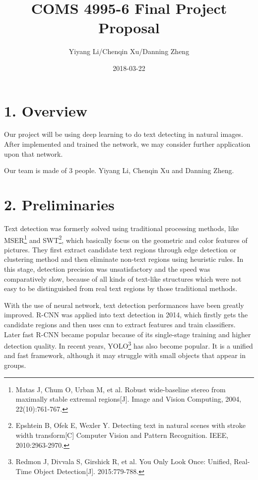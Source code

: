 \documentclass[]{article}
\title{COMS 4995-6 Final Project Proposal}
\author{Yiyang Li/Chenqin Xu/Danning Zheng}
\date{2018-03-22}
\begin{document}
\maketitle

\newcommand\E{\mathbb{E}}
\renewcommand\P{\mathbb{P}}
\newcommand\R{\mathbb{R}}
\newcommand\Var{\operatorname{Var}}

\section{1. Overview}

Our project will be using deep learning to do text detecting in natural images. After implemented and trained the network, we may consider further application upon that network.

Our team is made of 3 people. Yiyang Li, Chenqin Xu and Danning Zheng.

\section{2. Preliminaries}

Text detection was formerly solved using traditional processing methods, like MSER\footnote{Matas J, Chum O, Urban M, et al. Robust wide-baseline stereo from maximally stable extremal regions[J]. Image and Vision Computing, 2004, 22(10):761-767.} and SWT\footnote{Epshtein B, Ofek E, Wexler Y. Detecting text in natural scenes with stroke width transform[C] Computer Vision and Pattern Recognition. IEEE, 2010:2963-2970.}, which basically focus on the geometric and color features of pictures. They first extract candidate text regions through edge detection or clustering method and then eliminate non-text regions using heuristic rules. In this stage, detection precision was unsatisfactory and the speed was comparatively slow, because of all kinds of text-like structures which were not easy to be distinguished from real text regions by those traditional methods.

With the use of neural network, text detection performances have been greatly improved. R-CNN was applied into text detection in 2014, which firstly gets the candidate regions and then uses cnn to extract features and train classifiers. Later fast R-CNN became popular because of its single-stage training and higher detection quality. In recent years, YOLO\footnote{Redmon J, Divvala S, Girshick R, et al. You Only Look Once: Unified, Real-Time Object Detection[J]. 2015:779-788.} has also become popular. It is a unified and fast framework, although it may struggle with small objects that appear in groups.
\end{document}
